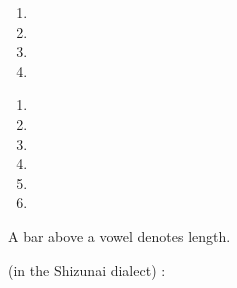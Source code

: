 \begin{refsection}
\begin{problem}{\langnameCree}{\nameIDerzhanski}{}
\begin{assgts}
\item \transinen
\begin{multicols}{2}
\begin{enumerate}[start = 9]
    \item {}
    \item {}
    \item {}
    \item {}
\end{enumerate}
\end{multicols}
\item \transinen[\langnameCree]
\begin{multicols}{2}
\begin{enumerate}[start = 13]
    \item {}
    \item {}
    \item {}
    \item {}
    \item {}
    \item {}
\end{enumerate}
\end{multicols}
\end{assgts}

\begin{tblsWarning}
A bar above a vowel denotes length.
\end{tblsWarning}
\end{problem}

\begin{problem}{\langnameAinu}{\nameVNeacsu}{}
\IntroSentences{\langnameAinu} (in the Shizunai dialect) \IntroAndEnglish:


\end{problem}
\end{refsection}
